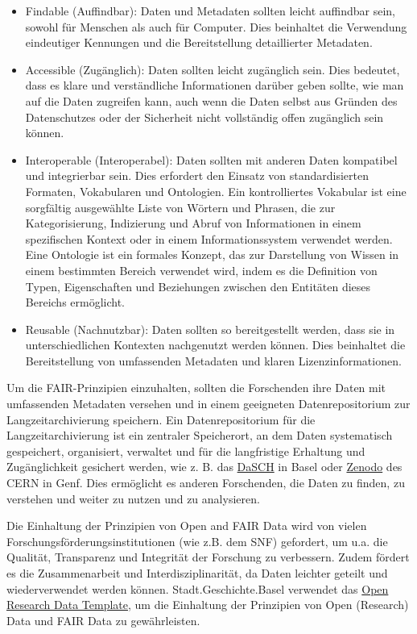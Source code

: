 \documentclass[
  letterpaper,
  DIV=11,
  numbers=noendperiod,
  landscape,
  a4paper,
  geometry:margin=1in]{scrartcl}
\begin{document}
\begin{itemize}
\item
  Findable (Auffindbar): Daten und Metadaten sollten leicht auffindbar
  sein, sowohl für Menschen als auch für Computer. Dies beinhaltet die
  Verwendung eindeutiger Kennungen und die Bereitstellung detaillierter
  Metadaten.
\item
  Accessible (Zugänglich): Daten sollten leicht zugänglich sein. Dies
  bedeutet, dass es klare und verständliche Informationen darüber geben
  sollte, wie man auf die Daten zugreifen kann, auch wenn die Daten
  selbst aus Gründen des Datenschutzes oder der Sicherheit nicht
  vollständig offen zugänglich sein können.
\item
  Interoperable (Interoperabel): Daten sollten mit anderen Daten
  kompatibel und integrierbar sein. Dies erfordert den Einsatz von
  standardisierten Formaten, Vokabularen und Ontologien. Ein
  kontrolliertes Vokabular ist eine sorgfältig ausgewählte Liste von
  Wörtern und Phrasen, die zur Kategorisierung, Indizierung und Abruf
  von Informationen in einem spezifischen Kontext oder in einem
  Informationssystem verwendet werden. Eine Ontologie ist ein formales
  Konzept, das zur Darstellung von Wissen in einem bestimmten Bereich
  verwendet wird, indem es die Definition von Typen, Eigenschaften und
  Beziehungen zwischen den Entitäten dieses Bereichs ermöglicht.
\item
  Reusable (Nachnutzbar): Daten sollten so bereitgestellt werden, dass
  sie in unterschiedlichen Kontexten nachgenutzt werden können. Dies
  beinhaltet die Bereitstellung von umfassenden Metadaten und klaren
  Lizenzinformationen.
\end{itemize}

Um die FAIR-Prinzipien einzuhalten, sollten die Forschenden ihre Daten
mit umfassenden Metadaten versehen und in einem geeigneten
Datenrepositorium zur Langzeitarchivierung speichern. Ein
Datenrepositorium für die Langzeitarchivierung ist ein zentraler
Speicherort, an dem Daten systematisch gespeichert, organisiert,
verwaltet und für die langfristige Erhaltung und Zugänglichkeit
gesichert werden, wie z. B. das \href{https://www.dasch.swiss/}{DaSCH}
in Basel oder \href{https://zenodo.org/}{Zenodo} des CERN in Genf. Dies
ermöglicht es anderen Forschenden, die Daten zu finden, zu verstehen und
weiter zu nutzen und zu analysieren.

Die Einhaltung der Prinzipien von Open and FAIR Data wird von vielen
Forschungsförderungsinstitutionen (wie z.B. dem SNF) gefordert, um u.a.
die Qualität, Transparenz und Integrität der Forschung zu verbessern.
Zudem fördert es die Zusammenarbeit und Interdisziplinarität, da Daten
leichter geteilt und wiederverwendet werden können.
Stadt.Geschichte.Basel verwendet das
\href{https://github.com/maehr/open-research-data-template}{Open
Research Data Template}, um die Einhaltung der Prinzipien von Open
(Research) Data und FAIR Data zu gewährleisten.
\end{document}
